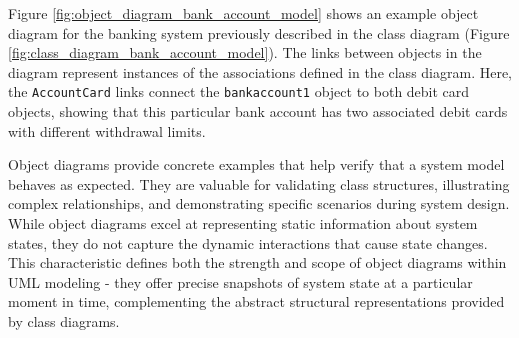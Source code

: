 Figure \ref{fig:object_diagram_bank_account_model} shows an example object diagram for the banking system previously described in the class diagram (Figure \ref{fig:class_diagram_bank_account_model}).
The links between objects in the diagram represent instances of the associations defined in the class diagram. Here, the \texttt{AccountCard} links connect the \texttt{bankaccount1} object to both debit card objects, showing that this particular bank account has two associated debit cards with different withdrawal limits.

Object diagrams provide concrete examples that help verify that a system model behaves as expected. They are valuable for validating class structures, illustrating complex relationships, and demonstrating specific scenarios during system design. While object diagrams excel at representing static information about system states, they do not capture the dynamic interactions that cause state changes. This characteristic defines both the strength and scope of object diagrams within UML modeling - they offer precise snapshots of system state at a particular moment in time, complementing the abstract structural representations provided by class diagrams.

